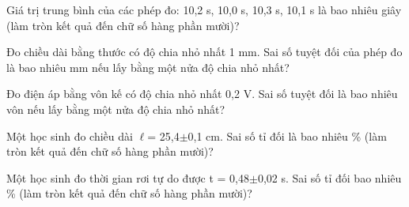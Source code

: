 \begin{ex} Giá trị trung bình của các phép đo: 10,2 s, 10,0 s, 10,3 s, 10,1 s là bao nhiêu
giây (làm tròn kết quả đến chữ số hàng phần mười)?

\par{}
\end{ex}

\begin{ex} Đo chiều dài bằng thước có độ chia nhỏ nhất 1 mm. Sai số tuyệt đối của phép
đo là bao nhiêu mm nếu lấy bằng một nửa độ chia nhỏ nhất?

\par{}
\end{ex}

\begin{ex} Đo điện áp bằng vôn kế có độ chia nhỏ nhất 0,2 V. Sai số tuyệt đối là bao nhiêu
vôn nếu lấy bằng một nửa độ chia nhỏ nhất?

\par{}
\end{ex}

\begin{ex} Một học sinh đo chiều dài $\ell$= 25,4$\pm$0,1 cm. Sai số tỉ đối là bao nhiêu \% (làm
tròn kết quả đến chữ số hàng phần mười)?

\par{}
\end{ex}

\begin{ex} Một học sinh đo thời gian rơi tự do được t = 0,48$\pm$0,02 s. Sai số tỉ đối bao nhiêu
\% (làm tròn kết quả đến chữ số hàng phần mười)?

\par{}
\end{ex}

